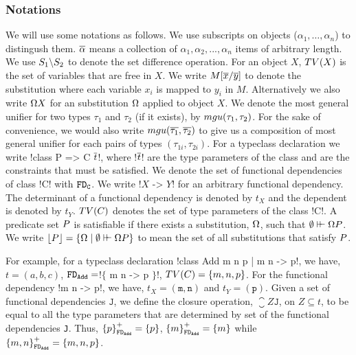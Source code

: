 \documentclass[format=acmsmall,manuscript,review,screen,nonacm,margin=1in,11pt]{acmart}
\begin{document}
\subsubsection {Notations}\label{subsubsec:fd-notations}
We will use some notations as follows. We use subscripts on objects
($\alpha_1,\ldots, \alpha_n$) to distingush them.
$\overline{\alpha}$ means a collection of $\alpha_1, \alpha_2, ..., \alpha_n$ items of arbitrary length.
We use $S_1 \backslash S_2$ to denote the set difference operation. For an object $X$,
$TV(X)$ is the set of variables that are free in $X$.
We write $M[\overline{x}/\overline{y}]$ to denote the substitution where each variable
$x_i$ is mapped to $y_i$ in $M$. Alternatively we also
write $\Omega X$ for an substitution $\Omega$ applied to object $X$.
We denote the most general unifier for two types $\tau_1$ and $\tau_2$ (if it exists),
by $mgu(\tau_1,\tau_2)$\cite{robinson_machine-oriented_1965}. For the sake of convenience,
we would also write $mgu(\overline{\tau_1},\overline{\tau_2})$ to give us a composition of most general
unifier for each pairs of types $(\tau_{1i}, \tau_{2i})$.
For a typeclass declaration we write !class P => C $\overline{t}$!, where !$\overline{t}$! are the type parameters
of the class and \Preds{} are the constraints that must be satisfied.
We denote the set of functional dependencies of class !C! with $\texttt{FD}_\texttt{C}$.
We write !$X$ -> $Y$! for an arbitrary functional dependency.
The determinant of a functional dependency is denoted by $t_{X}$
and the dependent is denoted by  $t_{Y}$. $TV(C)$ denotes the set of type parameters
of the class !C!. A predicate set $P$ is satisfiable if there exists a substitution,
$\Omega$, such that $\emptyset\vdash\hspace{-0.7ex}\vdash \Omega P$.
We write $\lfloor P\rfloor = \{\Omega \mid \emptyset \vdash\hspace{-0.7ex}\vdash \Omega P\}$
to mean the set of all substitutions that satisfy $P$.

For example, for a typeclass declaration !class Add m n p | m n -> p!,
we have, $t = (a, b, c)$, $\texttt{FD}_\texttt{Add}=$!$\{$ m n -> p $\}$!, $TV(C) = \{m, n, p\}$.
For the functional dependency !m n -> p!, we have, $t_X = {(\texttt{m},\texttt{n})}$ and $t_Y = {(\texttt{p})}$.
Given a set of functional dependencies $\texttt{J}$, we define the closure operation,
$\closure Z {\texttt{J}}$, on $Z \subseteq t$, to be equal to all the type parameters
that are determined by set of the functional dependencies \texttt{J}.
Thus, ${\{p\}}^{+}_{\texttt{FD}_\texttt{Add}} = \{p\}$,
${\{m\}}^{+}_{\texttt{FD}_\texttt{Add}} = \{m\}$ while ${\{m, n\}}^{+}_{\texttt{FD}_\texttt{Add}} = \{m, n, p\}$.
\end{document}
